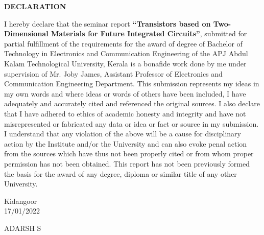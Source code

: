 \documentclass[12pt,a4paper]{report}
\begin{document}
\thispagestyle{empty}
\newpage
\begin{center}
\textbf{DECLARATION}\\
\end{center}
I hereby declare that the seminar report \textbf{“Transistors based on Two-Dimensional Materials
for Future Integrated Circuits”}, 
submitted for partial fulfillment of the requirements for the award of degree of 
Bachelor of Technology in Electronics and Communication Engineering of the APJ 
Abdul Kalam Technological University, Kerala is a bonafide work done by me
under supervision of Mr. Joby James, Assistant Professor of Electronics and Communication Engineering Department. 
This submission represents my ideas in
 my own words and where ideas or words of others have been included, I 
 have adequately and accurately cited and referenced the original sources. 
 I also declare that I have adhered to ethics of academic honesty and 
 integrity and have not misrepresented or fabricated any data or idea 
 or fact or source in my submission. I understand that any violation 
 of the above will be a cause for disciplinary action by the Institute 
 and/or the University and can also evoke penal action from the sources 
 which have thus not been properly cited or from whom proper permission 
 has not been obtained. This report has not been previously formed the 
 basis for the award of any degree, diploma or similar title of any other 
 University.

\noindent \begin{minipage}{0.45\linewidth}
\begin{flushleft}
\vspace{1 cm}
                         
Kidangoor \\
17/01/2022\\

\end{flushleft} 
\end{minipage}
\hfill
\begin{minipage}{0.45\linewidth}
\begin{flushright}                                      
\vspace{1cm}
                         
ADARSH S\\


\end{flushright} 
\end{minipage}

\thispagestyle{empty}
\end{document}
